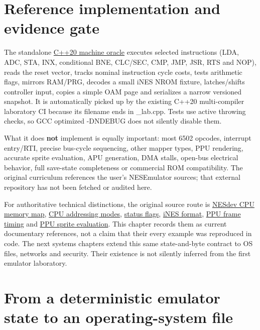 \section{Reference implementation and evidence gate}\label{01-foundations-i-ch016-reference-implementation-and-evidence-gate}

The standalone \hyperref[source-file-552a9e2296dc984412c8f06d]{C++20 machine oracle} executes selected instructions (LDA, ADC, STA, INX, conditional BNE, CLC/SEC, CMP, JMP, JSR, RTS and NOP), reads the reset vector, tracks nominal instruction cycle costs, tests arithmetic flags, mirrors RAM/PRG, decodes a small iNES NROM fixture, latches/shifts controller input, copies a simple OAM page and serializes a narrow versioned snapshot. It is automatically picked up by the existing C++20 multi-compiler laboratory CI because its filename ends in \_lab.cpp. Tests use active throwing checks, so GCC optimized -DNDEBUG does not silently disable them.

What it does \textbf{not} implement is equally important: most 6502 opcodes, interrupt entry/RTI, precise bus-cycle sequencing, other mapper types, PPU rendering, accurate sprite evaluation, APU generation, DMA stalls, open-bus electrical behavior, full save-state completeness or commercial ROM compatibility. The original curriculum references the user's NESEmulator sources; that external repository has not been fetched or audited here.

For authoritative technical distinctions, the original source route is \href{https://www.nesdev.org/wiki/CPU_memory_map}{NESdev CPU memory map}, \href{https://www.nesdev.org/wiki/Addressing_modes}{CPU addressing modes}, \href{https://www.nesdev.org/wiki/Status_flag}{status flags}, \href{https://www.nesdev.org/wiki/INES}{iNES format}, \href{https://www.nesdev.org/wiki/PPU_frame_timing}{PPU frame timing} and \href{https://www.nesdev.org/wiki/PPU_sprite_evaluation}{PPU sprite evaluation}. This chapter records them as current documentary references, not a claim that their every example was reproduced in code. The next systems chapters extend this same state-and-byte contract to OS files, networks and security. Their existence is not silently inferred from the first emulator laboratory.

\section{From a deterministic emulator state to an operating-system file}\label{01-foundations-i-ch016-from-a-deterministic-emulator-state-to-an-operating-system-file}

